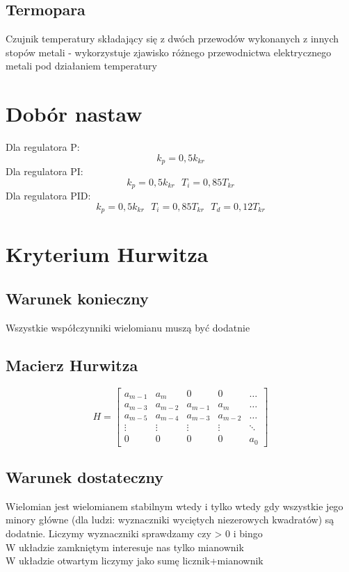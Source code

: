 \documentclass[a4paper]{article}
\begin{document}
\subsection{Termopara}
Czujnik temperatury składający się z dwóch przewodów wykonanych z innych stopów metali - wykorzystuje zjawisko różnego przewodnictwa elektrycznego metali pod działaniem temperatury

\section{Dobór nastaw}
Dla regulatora P: $$k_p = 0,5k_{kr}$$
Dla regulatora PI: $$k_p = 0,5k_{kr} \text{    } T_i=0,85T_{kr}$$
Dla regulatora PID: $$k_p = 0,5k_{kr} \text{     } T_i=0,85T_{kr} \text{     } T_d = 0,12T_{kr}$$


\section{Kryterium Hurwitza}
\subsection{Warunek konieczny}
Wszystkie współczynniki wielomianu muszą być dodatnie
\subsection{Macierz Hurwitza}
$$ H = 
\begin{bmatrix}
a_{m-1} & a_m & 0 & 0 & \ldots \\
a_{m-3} & a_{m-2} & a_{m-1} & a_m & \ldots \\
a_{m-5} & a_{m-4} & a_{m-3} & a_{m-2} & \ldots \\
\vdots & \vdots & \vdots & \vdots & \ddots \\
0&0&0&0&a_0
\end{bmatrix}$$
\subsection{Warunek dostateczny}
Wielomian jest wielomianem stabilnym wtedy i tylko wtedy gdy wszystkie jego minory główne (dla ludzi: wyznaczniki wyciętych niezerowych kwadratów) są dodatnie. Liczymy wyznaczniki sprawdzamy czy > 0 i bingo\\
W układzie zamkniętym interesuje nas tylko mianownik\\
W układzie otwartym liczymy jako sumę licznik+mianownik
\end{document}
